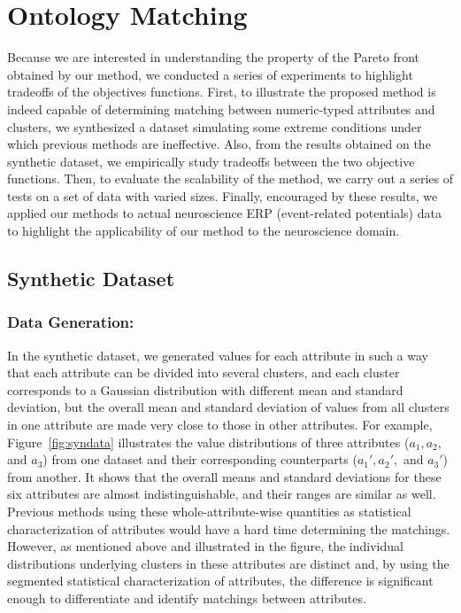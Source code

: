 \section{Ontology Matching}
\label{sec:experiment}
Because we are interested in understanding the property of the Pareto front obtained by our method, we conducted a series of experiments to highlight tradeoffs of the objectives functions. First, to illustrate the proposed method is indeed capable of determining matching between numeric-typed attributes and clusters, we synthesized a dataset simulating some extreme conditions under which previous methods are ineffective. Also, from the results obtained on the synthetic dataset, we empirically study tradeoffs between the two objective functions. Then, to evaluate the scalability of the method, we carry out a series of tests on a set of data with varied sizes. Finally, encouraged by these results, we applied our methods to actual neuroscience ERP (event-related potentials) data to highlight the applicability of our method to the neuroscience domain.

\subsection{Synthetic Dataset}
\label{sec:syn_exp}
\subsubsection{Data Generation:}
In the synthetic dataset, we generated values for each attribute in such a way that each attribute can be divided into several clusters, and each cluster corresponds to a Gaussian distribution with different mean and standard deviation, but the overall mean and standard deviation of values from all clusters in one attribute are made very close to those in other attributes. For example, Figure~\ref{fig:syndata} illustrates the value distributions of three attributes ($a_1, a_2,$ and $a_3$) from one dataset and their corresponding counterparts ($a_1', a_2',$ and $a_3'$) from another. It shows that the overall means and standard deviations for these six attributes are almost indistinguishable, and their ranges are similar as well. Previous methods using these whole-attribute-wise quantities as statistical characterization of attributes would have a hard time determining the matchings. However, as mentioned above and illustrated in the figure, the individual distributions underlying clusters in these attributes are distinct and, by using the segmented statistical characterization of attributes, the difference is significant enough to differentiate and identify matchings between attributes.

